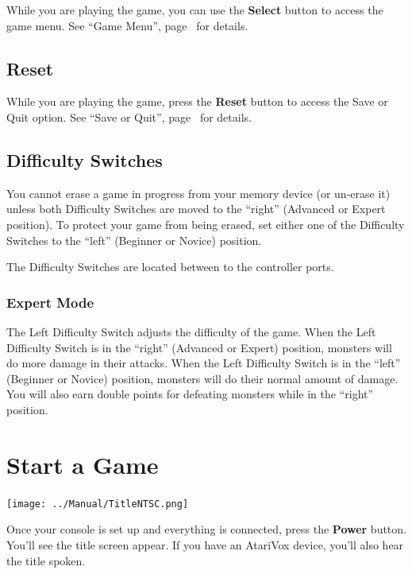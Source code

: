 \documentclass[10pt,twocolumn,openany,article]{memoir}
\begin{document}
While you are  playing the game, you can use  the \textbf{Select} button
to access the game  menu. See ``Game Menu'', page~\pageref{sec:GameMenu}
for details.

\subsection{Reset}

While  you are  playing the  game,  press the  \textbf{Reset} button  to
access   the   Save   or   Quit    option.   See   ``Save   or   Quit'',
page~\pageref{sec:SaveOrQuit} for details.

\subsection{Difficulty Switches}

You cannot erase a game in progress from your memory device (or un-erase
it) unless both Difficulty Switches are moved to the ``right'' (Advanced
or Expert position). To protect your  game from being erased, set either
one  of   the  Difficulty   Switches  to   the  ``left''   (Beginner  or
Novice) position.

The Difficulty Switches are located between to the controller ports.

\subsubsection*{Expert Mode}

The Left Difficulty Switch adjusts the  difficulty of the game. When the
Left Difficulty  Switch is in  the ``right'' (Advanced or  Expert) position,
monsters will do more damage in  their attacks. When the Left Difficulty
Switch is in  the ``left'' (Beginner or Novice) position,  monsters will do
their normal  amount of  damage. You  will also  earn double  points for
defeating monsters while in the ``right'' position.

\section{Start a Game}

\begin{center}
  \texttt{[image: ../Manual/TitleNTSC.png]}
\end{center}

Once  your console  is set  up and  everything is  connected, press  the
\textbf{Power} button. You'll  see the title screen appear.  If you have
an AtariVox device, you'll also hear the title spoken.
\end{document}
